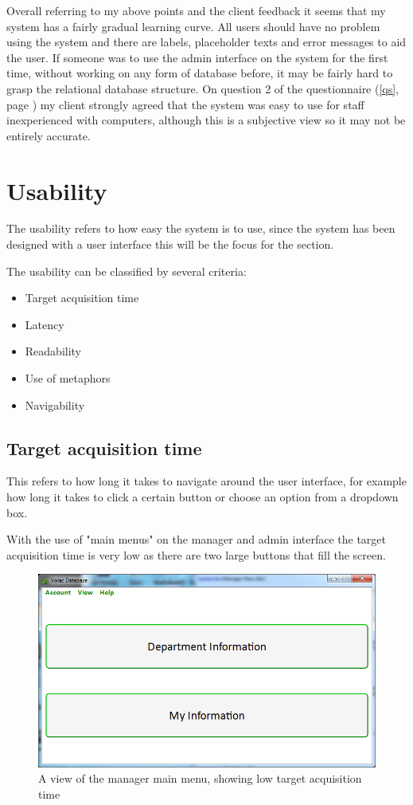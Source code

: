 Overall referring to my above points and the client feedback it seems that my system has a fairly gradual learning curve. All users should have no problem using the system and there are labels, placeholder texts and error messages to aid the user. If someone was to use the admin interface on the system for the first time, without working on any form of database before, it may be fairly hard to grasp the relational database structure. On question 2 of the questionnaire (\ref{qs}, page \pageref{qs}) my client strongly agreed that the system was easy to use for staff inexperienced with computers, although this is a subjective view so it may not be entirely accurate.

\section{Usability}

The usability refers to how easy the system is to use, since the system has been designed with a user interface this will be the focus for the section. 

The usability can be classified by several criteria:
\begin{itemize}
\item{Target acquisition time}
\item{Latency}
\item{Readability}
\item{Use of metaphors}
\item{Navigability}
\end{itemize}

\subsection{Target acquisition time}

This refers to how long it takes to navigate around the user interface, for example how long it takes to click a certain button or choose an option from a dropdown box.

With the use of "main menus" on the manager and admin interface the target acquisition time is very low as there are two large buttons that fill the screen.

\begin{figure}[H]
    \includegraphics[width=\textwidth]{./Maintenance/Images/ManagerMM.png}
    \caption{A view of the manager main menu, showing low target acquisition time} 
\end{figure}


